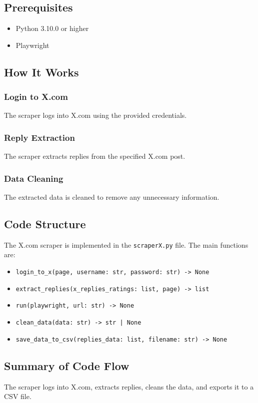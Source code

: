 \documentclass[a4paper]{article}
\begin{document}
\subsection{Prerequisites}
\begin{itemize}
    \item Python 3.10.0 or higher
    \item Playwright
\end{itemize}

\subsection{How It Works}
\subsubsection{Login to X.com}
The scraper logs into X.com using the provided credentials.

\subsubsection{Reply Extraction}
The scraper extracts replies from the specified X.com post.

\subsubsection{Data Cleaning}
The extracted data is cleaned to remove any unnecessary information.

\subsection{Code Structure}
The X.com scraper is implemented in the \texttt{scraperX.py} file. The main functions are:
\begin{itemize}
    \item \texttt{login\_to\_x(page, username: str, password: str) -> None}
    \item \texttt{extract\_replies(x\_replies\_ratings: list, page) -> list}
    \item \texttt{run(playwright, url: str) -> None}
    \item \texttt{clean\_data(data: str) -> str | None}
    \item \texttt{save\_data\_to\_csv(replies\_data: list, filename: str) -> None}
\end{itemize}

\subsection{Summary of Code Flow}
The scraper logs into X.com, extracts replies, cleans the data, and exports it to a CSV file.
\end{document}
